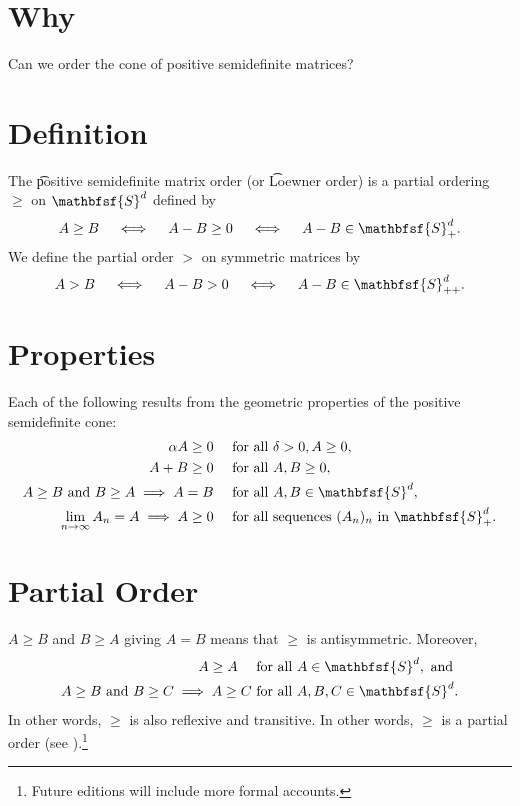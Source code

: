 
\section*{Why}

Can we order the cone of positive semidefinite matrices?

\section*{Definition}

The \t{positive semidefinite matrix order} (or \t{Loewner order}) is a partial ordering $\geq$ on $\mathbfsf{S} ^d$ defined by
\[
A \geq B \quad \iff \quad A - B \geq 0 \quad \iff \quad A - B \in \mathbfsf{S} _+^d.
\]
We define the partial order $>$ on symmetric matrices by
\[
A > B \quad \iff \quad A - B > 0 \quad \iff \quad A - B \in \mathbfsf{S} _{++}^d.
\]

\section*{Properties}

Each of the following results from the geometric properties of the positive semidefinite cone:
\[
\begin{aligned}
\alpha  A \geq 0 \quad & \text{ for all } \delta  > 0, A \geq 0, \\
A + B \geq 0 \quad & \text{ for all } A, B \geq 0, \\
A \geq B \text{ and } B \geq A \implies A = B \quad & \text{ for all } A, B \in \mathbfsf{S} ^d, \\
\lim_{n \to \infty} A_n = A \implies A \geq 0 \quad & \text{ for all sequences } (A_n)_n \text{ in } \mathbfsf{S} _+^d.
\end{aligned}
\]

\section*{Partial Order}

$A \geq B$ and $B \geq A$ giving $A = B$ means that $\geq$ is antisymmetric.
Moreover,
\[
\begin{aligned}
A \geq A \quad & \text{ for all } A \in \mathbfsf{S} ^d, \text{ and } \\
A \geq B \text{ and } B \geq C \implies A \geq C & \text { for all } A, B, C \in \mathbfsf{S} ^d.
\end{aligned}
\]
In other words, $\geq$ is also reflexive and transitive.
In other words, $\geq$ is a partial order (see ).\footnote{Future editions will include more formal accounts.}

